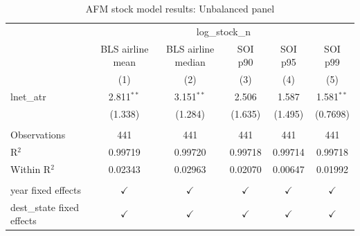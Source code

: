 
\begin{table}[htbp]
   \caption{AFM stock model results: Unbalanced panel}
   \bigskip
   \centering
   \small
   \begin{tabular}{lccccc}
      \toprule
       & \multicolumn{5}{c}{log\_stock\_n}\\
                                 & BLS airline mean & BLS airline median & SOI p90       & SOI p95       & SOI p99 \\   
                                 & (1)              & (2)                & (3)           & (4)           & (5)\\  
      \midrule 
      lnet\_atr                  & 2.811$^{**}$     & 3.151$^{**}$       & 2.506         & 1.587         & 1.581$^{**}$\\   
                                 & (1.338)          & (1.284)            & (1.635)       & (1.495)       & (0.7698)\\   
       \\
      Observations               & 441              & 441                & 441           & 441           & 441\\  
      R$^2$                      & 0.99719          & 0.99720            & 0.99718       & 0.99714       & 0.99718\\  
      Within R$^2$               & 0.02343          & 0.02963            & 0.02070       & 0.00647       & 0.01992\\  
       \\
      year fixed effects         & $\checkmark$     & $\checkmark$       & $\checkmark$  & $\checkmark$  & $\checkmark$\\   
      dest\_state fixed effects  & $\checkmark$     & $\checkmark$       & $\checkmark$  & $\checkmark$  & $\checkmark$\\   
      \bottomrule
   \end{tabular}
\end{table}


